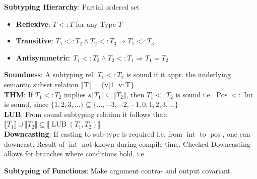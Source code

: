 
\textbf{Subtyping Hierarchy}: Partial ordered set 
\begin{itemize}[leftmargin = *,noitemsep]
\item \textbf{Reflexive}: $T <: T$ for any Type $T$
\item \textbf{Transitive}: $T_1 <: T_2 \wedge T_2 <: T_3 \Rightarrow T_1 <: T_3$
\item \textbf{Antisymmetric}: $T_1 <: T_2 \wedge T_2 <: T_1 \Rightarrow T_1 = T_2$
\end{itemize}
\textbf{Soundness}: A subtyping rel. $T_1 <: T_2 $ is sound if it appr. the underlying
semantic subset relation $\llbracket \mathrm{T} \rrbracket=\{\mathrm{v} \mid \vdash \mathrm{v}: \mathrm{T}\}$\\
\textbf{THM}: If $T_1 <: T_2 $ implies $s \llbracket T_1 \rrbracket \subseteq \llbracket T_2 \rrbracket$, then $T_1<: T_2$ is sound i.e. $\operatorname{Pos} <: \operatorname{Int}$ is sound, since $\{1,2,3, \ldots\} \subseteq\{\ldots,-3,-2,-1,0,1,2,3, \ldots\}$\\
\textbf{LUB}: From sound subtyping relation it follows that: $\llbracket T_1 \rrbracket \cup \llbracket T_2 \rrbracket \subseteq \llbracket \operatorname{LUB}(T_1, T_2) \rrbracket$\\
\textbf{Downcasting}: If casting to sub-type is required i.e. from $\operatorname{int}$ to $\operatorname{pos}$, one can downcast. Result of $\operatorname{int}$ not known during compile-time. Checked Downcasting allows for branches where conditions hold. i.e. 

\begin{prooftree}  
\end{prooftree} 

\textbf{Subtyping of Functions}: Make argument contra- and output covariant. 
\begin{prooftree} 
\end{prooftree}

